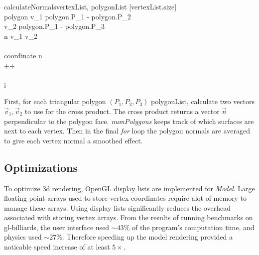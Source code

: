 	\begin{center}
	\begin{pseudocode}[framebox]{calculateNormals}{vertexList, polygonList}
	\label{algo:calcNormals}
	[vertexList.size]\\
	\FOREACH polygon \in {} \DO
	\BEGIN
	\vec v_1 \gets\vec polygon.P_1 - \vec polygon.P_2\\
	\vec v_2 \gets\vec polygon.P_1  - \vec polygon.P_3 \\
	\vec n \gets \vec v_1 \times \vec v_2 \\\\
		\FOREACH coordinate \in {} \DO
		\BEGIN
			 \vec n \\
			++
		\END
	\END
	\\\\
	\FOREACH i \in {} \DO
    \end{pseudocode}
    \end{center}
	
	First, for each triangular polygon \textit{$(P_1, P_2, P_3)$} polygonList, calculate two vectors $\vec v_1, \vec v_2$ to use for the cross
 product. The cross product returns a vector $\vec n$ perpendicular to the polygon face. \textit{numPolygons} keeps track of which surfaces are next 
to each vertex. Then in the final \textit{for} loop the polygon normals are averaged to give each vertex normal a smoothed effect.


	\subsection{Optimizations}
	To optimize 3d rendering, OpenGL display lists are implemented for \textit{Model}. Large floating point arrays used to store vertex coordinates 
require alot of memory to manage these arrays. Using display lists significantly reduces the overhead associated with storing vertex arrays. 
From the results of running benchmarks on gl-billiards, the user interface used $\sim43\%$ of the program's computation time, and
 physics used $\sim27\%$. Therefore speeding up the model rendering provided a noticable speed increase of at least $5\times$.

	

	


